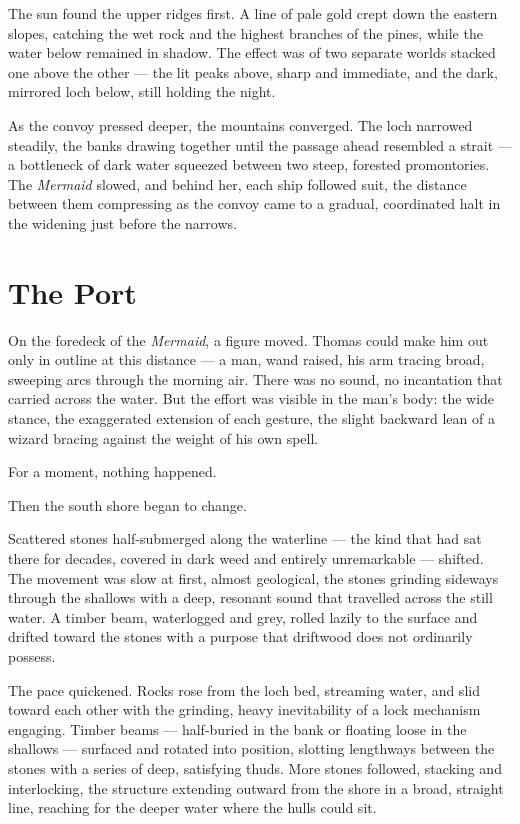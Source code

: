 The sun found the upper ridges first. A line of pale gold crept down the eastern slopes, catching the wet rock and the highest branches of the pines, while the water below remained in shadow. The effect was of two separate worlds stacked one above the other --- the lit peaks above, sharp and immediate, and the dark, mirrored loch below, still holding the night.

As the convoy pressed deeper, the mountains converged. The loch narrowed steadily, the banks drawing together until the passage ahead resembled a strait --- a bottleneck of dark water squeezed between two steep, forested promontories. The \textit{Mermaid} slowed, and behind her, each ship followed suit, the distance between them compressing as the convoy came to a gradual, coordinated halt in the widening just before the narrows.

\section*{The Port}

On the foredeck of the \textit{Mermaid}, a figure moved. Thomas could make him out only in outline at this distance --- a man, wand raised, his arm tracing broad, sweeping arcs through the morning air. There was no sound, no incantation that carried across the water. But the effort was visible in the man's body: the wide stance, the exaggerated extension of each gesture, the slight backward lean of a wizard bracing against the weight of his own spell.

For a moment, nothing happened.

Then the south shore began to change.

Scattered stones half-submerged along the waterline --- the kind that had sat there for decades, covered in dark weed and entirely unremarkable --- shifted. The movement was slow at first, almost geological, the stones grinding sideways through the shallows with a deep, resonant sound that travelled across the still water. A timber beam, waterlogged and grey, rolled lazily to the surface and drifted toward the stones with a purpose that driftwood does not ordinarily possess.

The pace quickened. Rocks rose from the loch bed, streaming water, and slid toward each other with the grinding, heavy inevitability of a lock mechanism engaging. Timber beams --- half-buried in the bank or floating loose in the shallows --- surfaced and rotated into position, slotting lengthways between the stones with a series of deep, satisfying thuds. More stones followed, stacking and interlocking, the structure extending outward from the shore in a broad, straight line, reaching for the deeper water where the hulls could sit.

